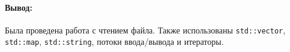 \paragraph{Вывод:}
Была проведена работа с чтением файла.
Также использованы \texttt{std::vector}, \texttt{std::map}, \texttt{std::string},
потоки ввода/вывода и итераторы.